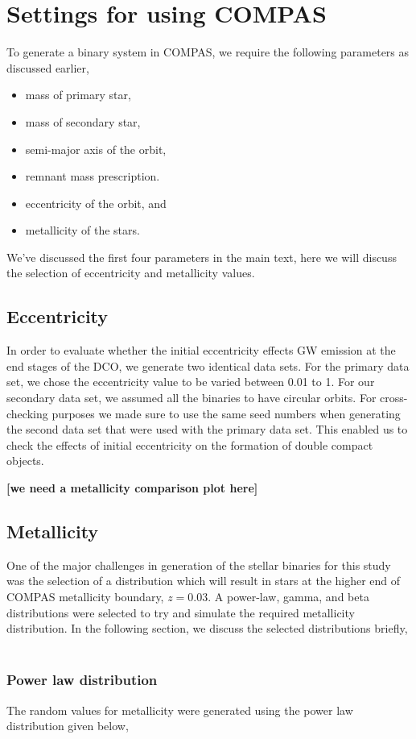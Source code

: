 \section{Settings for using COMPAS}
\label{sec:appA}
To generate a binary system in COMPAS, we require the following parameters as discussed earlier,
\begin{itemize}
	\item mass of primary star,
	\item mass of secondary star,
	\item semi-major axis of the orbit,
	\item remnant mass prescription.
	\item eccentricity of the orbit, and
	\item metallicity of the stars.
\end{itemize}

We've discussed the first four parameters in the main text, here we will discuss the selection of eccentricity and metallicity values.

\subsection{\textbf{Eccentricity}}
\label{subsec:eccentricity}
In order to evaluate whether the initial eccentricity effects GW emission at the end stages of the DCO, we generate two identical data sets.
For the primary data set, we chose the eccentricity value to be varied between 0.01 to 1.
For our secondary data set, we assumed all the binaries to have circular orbits.
For cross-checking purposes we made sure to use the same seed numbers when generating the second data set that were used with the primary data set.
This enabled us to check the effects of initial eccentricity on the formation of double compact objects.

\textbf{[we need a metallicity comparison plot here]}

\subsection{\textbf{Metallicity}}
\label{subsec:metallicity}
One of the major challenges in generation of the stellar binaries for this study was the selection of a distribution which will result in stars at the higher end of COMPAS metallicity boundary, $z = 0.03$.
A power-law, gamma, and beta distributions were selected to try and simulate the required metallicity distribution.
In the following section, we discuss the selected distributions briefly,
\,\\\subsubsection*{\textbf{Power law distribution}} The random values for metallicity were generated using the power law distribution given below,

